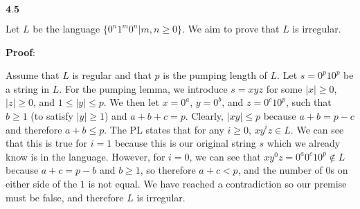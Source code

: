 \documentclass{article}
\newcommand{\problem}[1]{$\boxed{\textbf{#1}}$}
\begin{document}
\begin{minipage}{\textwidth}
\problem{4.5}

Let $L$ be the language $\{0^n1^m0^n|m,n\ge0\}$. We aim to prove that
$L$ is irregular.

\textbf{Proof}:

Assume that $L$ is regular and that $p$ is the pumping length of
$L$. Let $s=0^p10^p$ be a string in $L$. For the pumping lemma, we
introduce $s=xyz$ for some $|x|\ge0$, $|z|\ge0$, and
$1\le|y|\le{}p$. We then let $x=0^a$, $y=0^b$, and $z=0^c10^p$, such
that $b\ge1$ (to satisfy $|y|\ge1$) and $a+b+c=p$. Clearly,
$|xy|\le{}p$ because $a+b=p-c$ and therefore $a+b\le{}p$. The PL
states that for any $i\ge0$, $xy^iz\in{}L$. We can see that this is
true for $i=1$ because this is our original string $s$ which we
already know is in the language. However, for $i=0$, we can see that
$xy^0z=0^a0^c10^p\not\in{}L$ because $a+c=p-b$ and $b\ge1$, so
therefore $a+c<p$, and the number of $0$s on either side of the $1$ is
not equal. We have reached a contradiction so our premise must be
false, and therefore $L$ is irregular.

\end{minipage}
\end{document}
